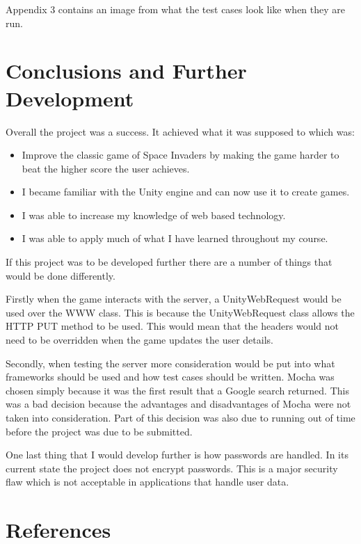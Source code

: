 \documentclass[12pt]{article}
\begin{document}
Appendix 3 contains an image from what the test cases look like when they are run.

\newpage
\section{Conclusions and Further Development}
Overall the project was a success. It achieved what it was supposed to which was:

\begin{itemize}
\item Improve the classic game of Space Invaders by making the game harder to beat the higher score the user achieves.
\item I became familiar with the Unity engine and can now use it to create games.
\item I was able to increase my knowledge of web based technology.
\item I was able to apply much of what I have learned throughout my course.
\end{itemize} 

If this project was to be developed further there are a number of things that would be done differently. 

Firstly when the game interacts with the server, a UnityWebRequest would be used over the WWW class. This is because the UnityWebRequest class allows the HTTP PUT method to be used. This would mean that the headers would not need to be overridden  when the game updates the user details.

Secondly, when testing the server more consideration would be put into what frameworks should be used and how test cases should be written. Mocha was chosen simply because it was the first result that a Google search returned. This was a bad decision because the advantages and disadvantages of Mocha were not taken into consideration. Part of this decision was also due to running out of time before the project was due to be submitted. 

One last thing that I would develop further is how passwords are handled. In its current state the project does not encrypt passwords. This is a major security flaw which is not acceptable in applications that handle user data. 

\newpage
\section*{References}
\end{document}
